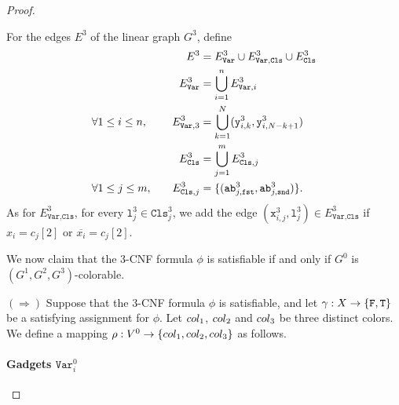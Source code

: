 \begin{proof}
\begin{mdframed}
    For the edges $E^{3}$ of the linear graph $G^{3}$,
    define
    \begin{alignat*}{2}
      &&
      E^{3} &= E^{3}_{\texttt{Var}} \cup E^{3}_{\texttt{Var},\texttt{Cls}} \cup E^{3}_{\texttt{Cls}}
      \\
      &&
      E^{3}_{\texttt{Var}} &= \bigcup_{i=1}^{n} E^{3}_{\texttt{Var}, i}
      \\
      &\forall 1\leq i \leq n,\quad&
      E^{3}_{\texttt{Var}, 3} &= \bigcup_{k=1}^{N} (\texttt{y}^{3}_{i,k}, \texttt{y}^{3}_{i,N-k+1})
      \\
      &&
      E^{3}_{\texttt{Cls}} &= \bigcup_{j=1}^{m} E^{3}_{\texttt{Cls}, j}
      \\
      &\forall 1\leq j \leq m,\quad&
      E^{3}_{\texttt{Cls}, j} &=
      \{
      (\texttt{ab}^{3}_{j,\texttt{fst}}, \texttt{ab}^{3}_{j,\texttt{snd}})
      \}\text{.}
    \end{alignat*}
    As for $E^{3}_{\texttt{Var},\texttt{Cls}}$,
    for every $\texttt{l}^{3}_{j} \in \texttt{Cls}^{3}_{j}$,
    we add the edge
    $(\texttt{x}^{3}_{i,j}, \texttt{l}^{3}_{j}) \in E^{3}_{\texttt{Var},\texttt{Cls}}$
    if $x_{i} = c_{j}[2]$ or $\overline{x_{i}} = c_{j}[2]$.
  \end{mdframed}

  \bigskip

  We now claim that the $3$-CNF formula $\phi$ is satisfiable
  if and only if
  $G^{0}$ is $(G^{1}, G^{2}, G^{3})$-colorable.

  $(\Rightarrow)$
  Suppose that the $3$-CNF formula $\phi$ is satisfiable, and
  let $\gamma : X \to \{\texttt{F}, \texttt{T}\}$ be a satisfying assignment
  for $\phi$.
  Let $col_1$, $col_2$ and $col_3$ be three distinct colors.
  We define a mapping
  $\rho : V^{0} \to \{col_1, col_2, col_3\}$ as follows.

  \paragraph*{Gadgets $\texttt{Var}^{0}_{i}$}


\end{proof}
